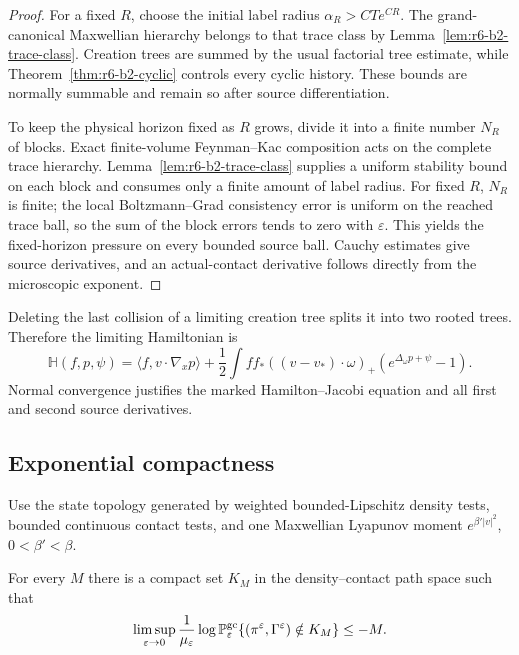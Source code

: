\begin{proof}
For a fixed \(R\), choose the initial label radius
\(\alpha_R>CTe^{CR}\).  The grand-canonical Maxwellian hierarchy belongs to
that trace class by Lemma~\ref{lem:r6-b2-trace-class}.  Creation trees are
summed by the usual factorial tree estimate, while
Theorem~\ref{thm:r6-b2-cyclic} controls every cyclic history.  These bounds
are normally summable and remain so after source differentiation.

To keep the physical horizon fixed as \(R\) grows, divide it into a finite
number \(N_R\) of blocks.  Exact finite-volume Feynman--Kac composition acts on
the complete trace hierarchy.  Lemma~\ref{lem:r6-b2-trace-class} supplies a
uniform stability bound on each block and consumes only a finite amount of
label radius.  For fixed \(R\), \(N_R\) is finite; the local
Boltzmann--Grad consistency error is uniform on the reached trace ball, so the
sum of the block errors tends to zero with \(\varepsilon\).  This yields the
fixed-horizon pressure on every bounded source ball.  Cauchy estimates give
source derivatives, and an actual-contact derivative follows directly from
the microscopic exponent.
\end{proof}

Deleting the last collision of a limiting creation tree splits it into two
rooted trees.  Therefore the limiting Hamiltonian is
\[
\mathbb H(f,p,\psi)=
\langle f,v\cdot\nabla_xp\rangle+
\frac12\int ff_*((v-v_*)\cdot\omega)_+
\left(e^{\Delta_\omega p+\psi}-1\right).
\]
Normal convergence justifies the marked Hamilton--Jacobi equation and all
first and second source derivatives.

\subsection{Exponential compactness}

Use the state topology generated by weighted bounded-Lipschitz density tests,
bounded continuous contact tests, and one Maxwellian Lyapunov moment
\(e^{\beta'|v|^2}\), \(0<\beta'<\beta\).

\begin{lemma}
\label{lem:r6-b2-compact}
For every \(M\) there is a compact set \(K_M\) in the density--contact path
space such that
\[
\limsup_{\varepsilon\to0}\frac1{\mu_\varepsilon}
\log\mathbb P_\varepsilon^{\rm gc}
\{(\pi^\varepsilon,\Gamma^\varepsilon)\notin K_M\}
\le-M.
\]
\end{lemma}

